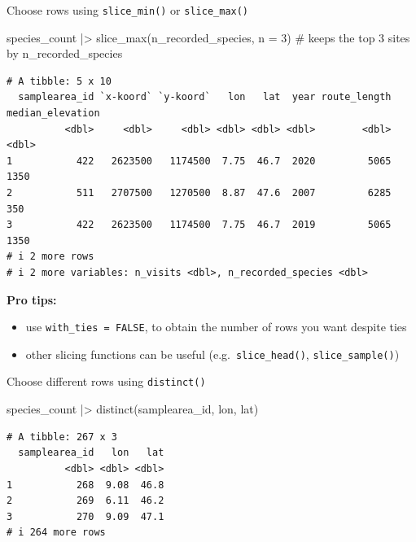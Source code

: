 \documentclass[
  ignorenonframetext,
  aspectratio=169,
]{beamer}
\newenvironment{Shaded}{\begin{snugshade}}{\end{snugshade}}
\newcommand{\AttributeTok}[1]{\textcolor[rgb]{0.40,0.45,0.13}{#1}}
\newcommand{\CommentTok}[1]{\textcolor[rgb]{0.37,0.37,0.37}{#1}}
\newcommand{\DecValTok}[1]{\textcolor[rgb]{0.68,0.00,0.00}{#1}}
\newcommand{\FunctionTok}[1]{\textcolor[rgb]{0.28,0.35,0.67}{#1}}
\newcommand{\NormalTok}[1]{\textcolor[rgb]{0.00,0.23,0.31}{#1}}
\newcommand{\SpecialCharTok}[1]{\textcolor[rgb]{0.37,0.37,0.37}{#1}}
\providecommand{\tightlist}{%
  \setlength{\itemsep}{0pt}\setlength{\parskip}{0pt}}
\let\oldtexttt\texttt
\renewcommand{\texttt}[1]{\colorbox{gray!20}{\oldtexttt{#1}}}
\begin{document}
\begin{frame}[fragile]{Choose rows using \texttt{slice\_min()} or
\texttt{slice\_max()}}
\protect{}\label{choose-rows-using-slice_min-or-slice_max}
\footnotesize

\begin{Shaded}
\begin{Highlighting}[]
\NormalTok{species\_count }\SpecialCharTok{|\textgreater{}}
    \FunctionTok{slice\_max}\NormalTok{(n\_recorded\_species, }\AttributeTok{n =} \DecValTok{3}\NormalTok{) }\CommentTok{\# keeps the top 3 sites by n\_recorded\_species}
\end{Highlighting}
\end{Shaded}

\begin{verbatim}
# A tibble: 5 x 10
  samplearea_id `x-koord` `y-koord`   lon   lat  year route_length median_elevation
          <dbl>     <dbl>     <dbl> <dbl> <dbl> <dbl>        <dbl>            <dbl>
1           422   2623500   1174500  7.75  46.7  2020         5065             1350
2           511   2707500   1270500  8.87  47.6  2007         6285              350
3           422   2623500   1174500  7.75  46.7  2019         5065             1350
# i 2 more rows
# i 2 more variables: n_visits <dbl>, n_recorded_species <dbl>
\end{verbatim}

\normalsize

\pause

\textbf{Pro tips:}

\begin{itemize}
\tightlist
\item
  use \texttt{with\_ties\ =\ FALSE}, to obtain the number of rows you
  want despite ties
\item
  other slicing functions can be useful (e.g.~\texttt{slice\_head()},
  \texttt{slice\_sample()})
\end{itemize}
\end{frame}

\begin{frame}[fragile]{Choose different rows using \texttt{distinct()}}
\protect{}\label{choose-different-rows-using-distinct}
\footnotesize

\begin{Shaded}
\begin{Highlighting}[]
\NormalTok{species\_count }\SpecialCharTok{|\textgreater{}} \FunctionTok{distinct}\NormalTok{(samplearea\_id, lon, lat)}
\end{Highlighting}
\end{Shaded}

\begin{verbatim}
# A tibble: 267 x 3
  samplearea_id   lon   lat
          <dbl> <dbl> <dbl>
1           268  9.08  46.8
2           269  6.11  46.2
3           270  9.09  47.1
# i 264 more rows
\end{verbatim}

\normalsize
\end{frame}
\end{document}
